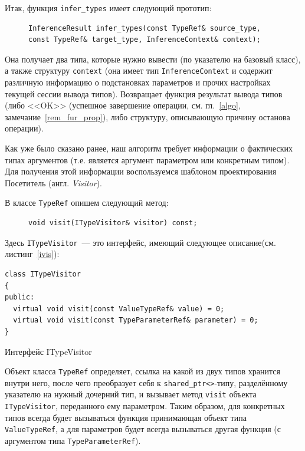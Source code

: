Итак, функция \lstinline!infer_types! имеет следующий прототип:
\begin{figure}[H]
	\begin{lstlisting}
InferenceResult infer_types(const TypeRef& source_type, const TypeRef& target_type, InferenceContext& context);
	\end{lstlisting}
\end{figure}
Она получает два типа, которые нужно вывести (по указателю на базовый класс), а также структуру \lstinline!context! (она имеет тип \lstinline!InferenceContext! и содержит различную информацию о подстановках параметров и прочих настройках текущей сессии вывода типов).
Возвращает функция результат вывода типов (либо <<OK>> (успешное завершение операции, см. гл.~\ref{algo}, замечание~\ref{rem_fur_prop}), либо структуру, описывающую причину останова операции).

Как уже было сказано ранее, наш алгоритм требует информации о фактических типах аргументов (т.е. является аргумент параметром или конкретным типом). Для получения этой информации воспользуемся шаблоном проектирования Посетитель (англ. \textit{Visitor}).

В классе \lstinline!TypeRef! опишем следующий метод:
\begin{figure}[H]
	\begin{lstlisting}
void visit(ITypeVisitor& visitor) const;
	\end{lstlisting}
\end{figure}
Здесь \lstinline!ITypeVisitor!~--- это интерфейс, имеющий следующее описание(см. листинг~\ref{ivis}):
\begin{ListingEnv}[H]
	\begin{lstlisting}
class ITypeVisitor
{
public:
  virtual void visit(const ValueTypeRef& value) = 0;
  virtual void visit(const TypeParameterRef& parameter) = 0;
}
	\end{lstlisting}
	\caption{Интерфейс ITypeVisitor}\label{ivis}
\end{ListingEnv}

Объект класса \lstinline!TypeRef! определяет, ссылка на какой из двух типов хранится внутри него, после чего преобразует себя к \lstinline!shared_ptr<>!-типу, разделённому указателю на нужный дочерний тип, и вызывает метод \lstinline!visit! объекта \lstinline!ITypeVisitor!, переданного ему параметром. Таким образом, для конкретных типов всегда будет вызываться функция принимающая объект типа \lstinline!ValueTypeRef!, а для параметров будет всегда вызываться другая функция (с аргументом типа \lstinline!TypeParameterRef!).


